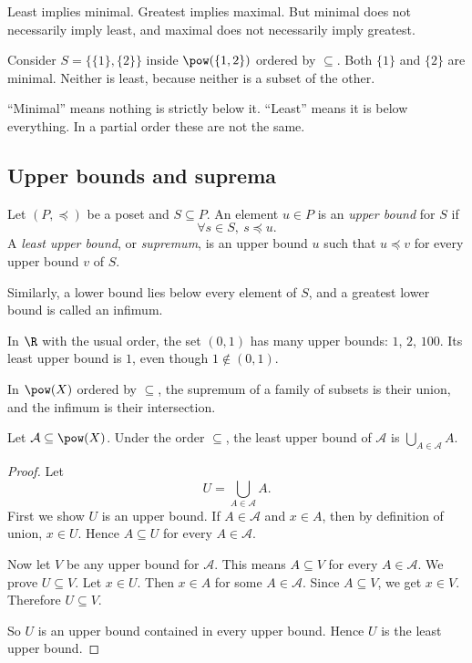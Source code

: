 Least implies minimal. Greatest implies maximal. But minimal does not necessarily imply least, and maximal does not necessarily imply greatest.

Consider $S=\{\{1\},\{2\}\}$ inside $\pow(\{1,2\})$ ordered by $\subseteq$. Both $\{1\}$ and $\{2\}$ are minimal. Neither is least, because neither is a subset of the other.

\begin{trapbox}
``Minimal'' means nothing is strictly below it. ``Least'' means it is below everything. In a partial order these are not the same.
\end{trapbox}

\subsection{Upper bounds and suprema}

\begin{definition}
Let $(P,\preceq)$ be a poset and $S\subseteq P$. An element $u\in P$ is an \emph{upper bound} for $S$ if
\[
\forall s\in S,\ s\preceq u.
\]
A \emph{least upper bound}, or \emph{supremum}, is an upper bound $u$ such that $u\preceq v$ for every upper bound $v$ of $S$.
\end{definition}

Similarly, a lower bound lies below every element of $S$, and a greatest lower bound is called an infimum.

In $\R$ with the usual order, the set $(0,1)$ has many upper bounds: $1$, $2$, $100$. Its least upper bound is $1$, even though $1\notin(0,1)$.

In $\pow(X)$ ordered by $\subseteq$, the supremum of a family of subsets is their union, and the infimum is their intersection.

\begin{theorem}
Let $\mathcal{A}\subseteq\pow(X)$. Under the order $\subseteq$, the least upper bound of $\mathcal{A}$ is $\bigcup_{A\in\mathcal{A}}A$.
\end{theorem}

\begin{proof}
Let
\[
U=\bigcup_{A\in\mathcal{A}}A.
\]
First we show $U$ is an upper bound. If $A\in\mathcal{A}$ and $x\in A$, then by definition of union, $x\in U$. Hence $A\subseteq U$ for every $A\in\mathcal{A}$.

Now let $V$ be any upper bound for $\mathcal{A}$. This means $A\subseteq V$ for every $A\in\mathcal{A}$. We prove $U\subseteq V$. Let $x\in U$. Then $x\in A$ for some $A\in\mathcal{A}$. Since $A\subseteq V$, we get $x\in V$. Therefore $U\subseteq V$.

So $U$ is an upper bound contained in every upper bound. Hence $U$ is the least upper bound.
\end{proof}

